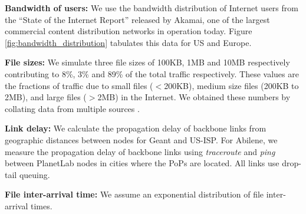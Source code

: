 \noindent\textbf{Bandwidth of users:} We use the bandwidth distribution of Internet users from the  ``State of the Internet Report'' \cite{Akamai-soti} released by Akamai, one of the largest commercial content distribution networks in operation today. Figure \ref{fig:bandwidth_distribution} tabulates this data for US and Europe.

\noindent\textbf{File sizes:} We simulate three file sizes of 100KB, 1MB and 10MB respectively contributing to  8\%, 3\% and 89\% of the total traffic respectively. These values are the fractions of traffic due to small files ($<$200KB), medium size files (200KB to 2MB), and large files ($>$2MB) in the Internet. We obtained these numbers by collating data from multiple sources \cite{urlinternet,kazaa,youtubestudy,pareto}.


\noindent\textbf{Link delay:} We calculate the propagation delay of backbone links from geographic distances between nodes for Geant and US-ISP. For Abilene, we measure the propagation delay of backbone links using \emph{traceroute} and \emph{ping} between PlanetLab \cite{Planetlab} nodes in cities where the PoPs are located. All links use drop-tail queuing.


\noindent\textbf{File inter-arrival time:} We  assume an exponential distribution of file inter-arrival times.




